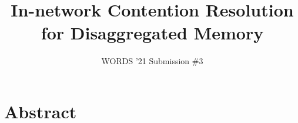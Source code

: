 \documentclass[10pt,twocolumn]{article}
\begin{document}
\title{In-network Contention Resolution for Disaggregated Memory}
\author{WORDS '21 Submission \#3}
\date{}

\maketitle

\section{Abstract}





\balance
\vspace{-0.3cm}
{\footnotesize 
}
\vspace{-0.5cm}
\end{document}
